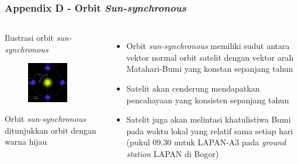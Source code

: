 \documentclass[8pt]{beamer}
\begin{document}
\begin{frame}
  \frametitle{Appendix D - Orbit \textit{Sun-synchronous}}
  \begin{columns}[T]
    \begin{block}{Ilustrasi orbit \textit{sun-synchronous}}
      \begin{figure}
          \includegraphics[width=0.8\textwidth]{figure/sso.png}
      \end{figure}
      Orbit \textit{sun-synchronous} ditunjukkan orbit dengan warna hijau
    \end{block}
    \begin{itemize}
      \item Orbit \textit{sun-synchronous} memiliki sudut antara vektor normal orbit satelit dengan vektor arah Matahari-Bumi yang konstan sepanjang tahun
      \item Satelit akan cenderung mendapatkan pencahayaan yang konsisten sepanjang tahun
      \item Satelit juga akan melintasi khatulistiwa Bumi pada waktu lokal yang relatif sama setiap hari (pukul 09.30 untuk LAPAN-A3 pada \textit{ground station} LAPAN di Bogor)
    \end{itemize}
  \end{columns}
\end{frame}
\end{document}
